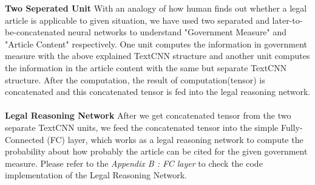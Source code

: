 \documentclass[sigconf]{acmart}
\begin{document}
\textbf{Two Seperated Unit} With an analogy of how human finds out whether a legal article is applicable to given situation, we have used two separated and later-to-be-concatenated neural networks to understand "Government Measure" and "Article Content" respectively. One unit computes the information in government measure with the above explained TextCNN structure and another unit computes the information in the article content with the same but separate TextCNN structure. After the computation, the result of computation(tensor) is concatenated and this concatenated tensor is fed into the legal reasoning network.\\\\
\textbf{Legal Reasoning Network} After we get concatenated tensor from the two separate TextCNN units, we feed the concatenated tensor into the simple Fully-Connected (FC) layer, which works as a legal reasoning network to compute the probability about how probably the article can be cited for the given government measure. Please refer to the \textit{Appendix B : FC layer} to check the code implementation of the Legal Reasoning Network.
\end{document}
